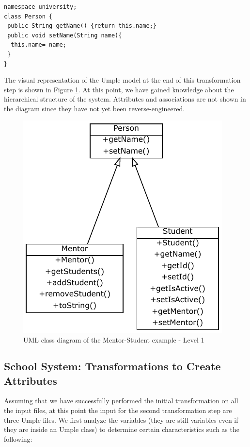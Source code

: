 \begin{lstlisting}[style=UmpleIn,caption=Person.ump,label=lst:personUmple0]
namespace university;
class Person { 
 public String getName() {return this.name;}
 public void setName(String name){
  this.name= name;
 }
}
\end{lstlisting}

The visual representation of the Umple model at the end of this transformation step is shown in Figure \ref{fig:Example1a1}. At this point, we have gained knowledge about the hierarchical structure of the system. Attributes and associations are not shown in the diagram since they have not yet been reverse-engineered.

\begin{figure}[h]
\centering
\includegraphics{Figures/Example1a1.pdf} 
\caption{UML class diagram of the Mentor-Student example - Level 1}
\label{fig:Example1a1}
\end{figure}

\subsection{School System: Transformations to Create Attributes}

Assuming that we have successfully performed the initial transformation on all the input files, at this point the input for the second transformation step are three Umple files.
We first analyze the variables (they are still variables even if they are inside an Umple class) to determine certain characteristics such as the following:

